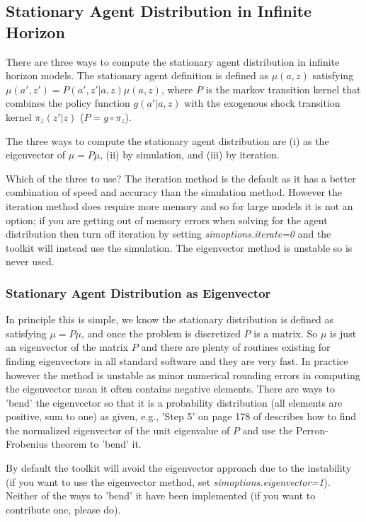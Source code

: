 \subsection{Stationary Agent Distribution in Infinite Horizon}
There are three ways to compute the stationary agent distribution in infinite horizon models. The stationary agent definition is defined as $\mu(a,z)$ satisfying $\mu(a',z')=P(a',z'|a,z) \mu(a,z)$, where $P$ is the markov transition kernel that combines the policy function $g(a'|a,z)$ with the exogenous shock transition kernel $\pi_z(z'|z)$ ($P=g \circ \pi_z$).

The three ways to compute the stationary agent distribution are (i) as the eigenvector of $\mu = P \mu$, (ii) by simulation, and (iii) by iteration.

Which of the three to use? The iteration method is the default as it has a better combination of speed and accuracy than the simulation method. However the iteration method does require more memory and so for large models it is not an option; if you are getting out of memory errors when solving for the agent distribution then turn off iteration by setting \textit{simoptions.iterate=0} and the toolkit will instead use the simulation. The eigenvector method is unstable so is never used.

\subsubsection{Stationary Agent Distribution as Eigenvector}
In principle this is simple, we know the stationary distribution is defined as satisfying $\mu = P \mu$, and once the problem is discretized $P$ is a matrix. So $\mu$ is just an eigenvector of the matrix $P$ and there are plenty of routines existing for finding eigenvectors in all standard software and they are very fast. In practice however the method is unstable as minor numerical rounding errors in computing the eigenvector mean it often contains negative elements. There are ways to 'bend' the eigenvector so that it is a probability distribution (all elements are positive, sum to one) as given, e.g., 'Step 5' on page 178 of \cite*{BadshahBeaumontSrivastava2013} describes how to find the normalized eigenvector of the unit eigenvalue of $P$ and use the Perron-Frobenius theorem to 'bend' it.

By default the toolkit will avoid the eigenvector approach due to the instability (if you want to use the eigenvector method, set \textit{simoptions.eigenvector=1}). Neither of the ways to 'bend' it have been implemented (if you want to contribute one, please do).

